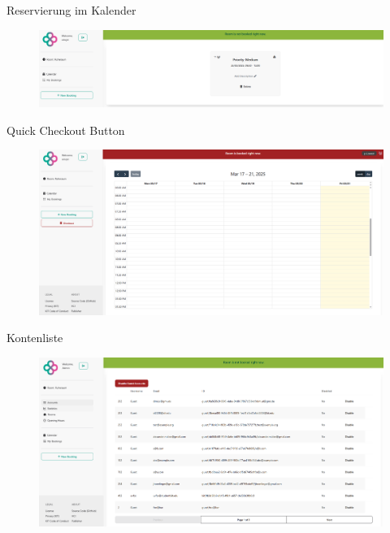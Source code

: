 \begin{frame}{Reservierung im Kalender}
    \thispagestyle{plain}
    \begin{figure}
        \centering
        \includegraphics[width=1\linewidth]{pictures/bookings_single.png}
        \label{fig:enter-label}
    \end{figure}
\end{frame}

\begin{frame}{Quick Checkout Button}
    \thispagestyle{plain}
    \begin{figure}
        \centering
        \includegraphics[width=1\linewidth]{pictures/check_out_button_light.png}
        \label{fig:enter-label}
    \end{figure}
\end{frame}

\begin{frame}{Kontenliste}
    \thispagestyle{plain}
    \begin{figure}
        \centering
        \includegraphics[width=1\linewidth]{pictures/admin_users.png}
        \label{fig:enter-label}
    \end{figure}
    
\end{frame}

